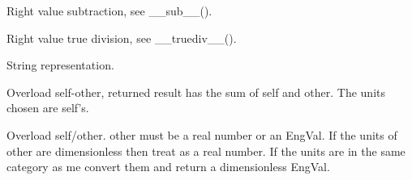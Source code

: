 \documentclass[letterpaper,10pt,english]{sphinxmanual}
\begin{document}
\begin{fulllineitems}
\begin{fulllineitems}
\end{fulllineitems}


\begin{fulllineitems}
\label{\detokenize{ref/LIS/core/EngVal:TotalDepth.LIS.core.EngVal.EngVal.__rsub__}}
Right value subtraction, see \_\_sub\_\_().

\end{fulllineitems}


\begin{fulllineitems}
\label{\detokenize{ref/LIS/core/EngVal:TotalDepth.LIS.core.EngVal.EngVal.__rtruediv__}}
Right value true division, see \_\_truediv\_\_().

\end{fulllineitems}


\begin{fulllineitems}
\label{\detokenize{ref/LIS/core/EngVal:TotalDepth.LIS.core.EngVal.EngVal.__str__}}
String representation.

\end{fulllineitems}


\begin{fulllineitems}
\label{\detokenize{ref/LIS/core/EngVal:TotalDepth.LIS.core.EngVal.EngVal.__sub__}}
Overload self-other, returned result has the sum of self and other.
The units chosen are self’s.

\end{fulllineitems}


\begin{fulllineitems}
\label{\detokenize{ref/LIS/core/EngVal:TotalDepth.LIS.core.EngVal.EngVal.__truediv__}}
Overload self/other. other must be a real number or an EngVal. If
the units of other are dimensionless then treat as a real number.
If the units are in the same category as me convert them and return a
dimensionless EngVal.


\end{fulllineitems}
\end{fulllineitems}
\end{document}
